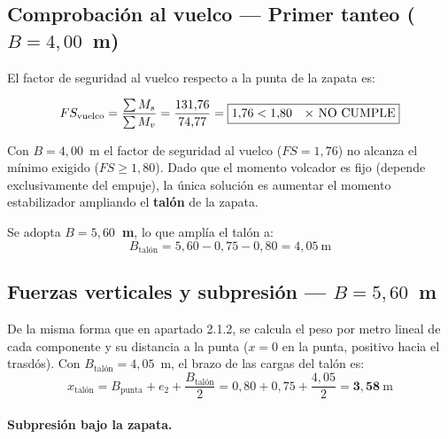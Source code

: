 \subsection{Comprobación al vuelco — Primer tanteo ($B = 4{,}00$~m)}
\label{subsec:vuelco_4m}

El factor de seguridad al vuelco respecto a la punta de la zapata es:

\begin{equation}
  FS_\text{vuelco} = \frac{\sum M_s}{\sum M_v}
    = \frac{131{,}76}{74{,}77} = \resultado{1{,}76 < 1{,}80 \quad \text{\texttimes\ NO CUMPLE}}
  \label{eq:fs_vuelco_4m}
\end{equation}

\begin{supuestobox}[Decisión: ampliar la base de zapata a B = 5 m]
  Con $B = 4{,}00$~m el factor de seguridad al vuelco ($FS = 1{,}76$) no alcanza
  el mínimo exigido ($FS \geq 1{,}80$). Dado que el momento volcador es fijo
  (depende exclusivamente del empuje), la única solución es aumentar el momento
  estabilizador ampliando el \textbf{talón} de la zapata.

  Se adopta \textbf{$B = 5{,}60$~m}, lo que amplía el talón a:
  \[
    B_{\text{talón}} = 5{,}60 - 0{,}75 - 0{,}80 = 4{,}05~\text{m}
  \]
\end{supuestobox}

\subsection{Fuerzas verticales y subpresión — $B = 5{,}60$~m}
\label{subsec:fuerzas_verticales_56m}

De la misma forma que en apartado 2.1.2, se calcula el peso por metro lineal de cada componente y su distancia a la
punta ($x = 0$ en la punta, positivo hacia el trasdós).
Con $B_\text{talón} = 4{,}05$~m, el brazo de las cargas del talón es:
\[
  x_\text{talón} = B_\text{punta} + e_2 + \frac{B_\text{talón}}{2}
    = 0{,}80 + 0{,}75 + \frac{4{,}05}{2} = \mathbf{3{,}58}~\text{m}
\]

\paragraph{Subpresión bajo la zapata.}

